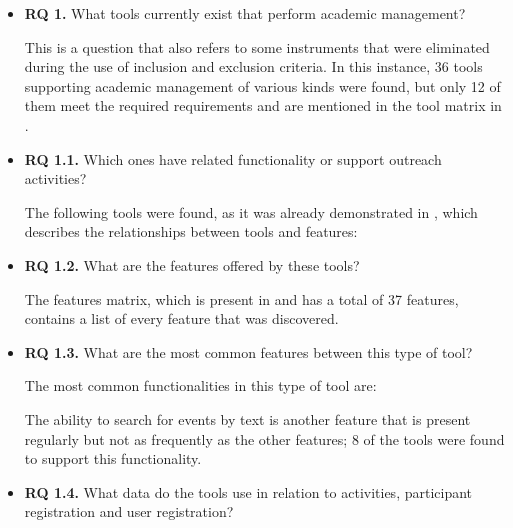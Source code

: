 \begin{itemize}
  \item \textbf{RQ 1.} What tools currently exist that perform academic management?

        This is a question that also refers to some instruments that were eliminated during the use of inclusion and exclusion criteria. In this instance, 36 tools supporting academic management of various kinds were found, but only 12 of them meet the required requirements and are mentioned in the tool matrix in .
  \item \textbf{RQ 1.1.} Which ones have related functionality or support outreach activities?

        The following tools were found, as it was already demonstrated in , which describes the relationships between tools and features:

  \item \textbf{RQ 1.2.} What are the features offered by these tools?

        The features matrix, which is present in  and has a total of 37 features, contains a list of every feature that was discovered.
  \item \textbf{RQ 1.3.} What are the most common features between this type of tool?

        The most common functionalities in this type of tool are:
        The ability to search for events by text is another feature that is present regularly but not as frequently as the other features; 8 of the tools were found to support this functionality.
  \item \textbf{RQ 1.4.} What data do the tools use in relation to activities, participant registration and user registration?


\end{itemize}
